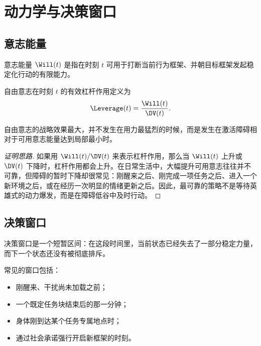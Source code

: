 \chapter{动力学与决策窗口}
\label{ch:dynamics}

\section{意志能量}

\begin{definition}[意志能量]
意志能量 $\Will(t)$ 是指在时刻 $t$ 可用于打断当前行为框架、并朝目标框架发起稳定化行动的有限能力。
\end{definition}

\begin{definition}[杠杆作用]
自由意志在时刻 $t$ 的有效杠杆作用定义为
\[
  \Leverage(t) = \frac{\Will(t)}{\DV(t)}.
\]
\end{definition}

\begin{theorem}[决策窗口原理]
自由意志的战略效果最大，并不发生在用力最猛烈的时候，而是发生在激活障碍相对于可用意志能量达到局部最小时。
\end{theorem}

\begin{proof}[证明思路]
如果用 $\Will(t)/\DV(t)$ 来表示杠杆作用，那么当 $\Will(t)$ 上升或 $\DV(t)$ 下降时，杠杆作用都会上升。在日常生活中，大幅提升可用意志往往并不可靠，但障碍的暂时下降却很常见：刚醒来之后、刚完成一项任务之后、进入一个新环境之后，或在经历一次明显的情绪更新之后。因此，最可靠的策略不是等待英雄式的动力爆发，而是在障碍低谷中及时行动。
\end{proof}

\section{决策窗口}

\begin{definition}[决策窗口]
决策窗口是一个短暂区间：在这段时间里，当前状态已经失去了一部分稳定力量，而下一个状态还没有被彻底排斥。
\end{definition}

常见的窗口包括：
\begin{itemize}[nosep]
  \item 刚醒来、干扰尚未加载之前；
  \item 一个既定任务块结束后的那一分钟；
  \item 身体刚到达某个任务专属地点时；
  \item 通过社会承诺强行开启新框架的时刻。
\end{itemize}

